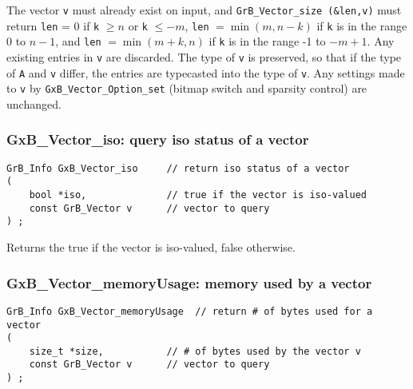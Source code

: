 \documentclass[12pt]{article}
\begin{document}
{The vector \verb'v' must already exist on input, and
\verb'GrB_Vector_size (&len,v)' must return \verb'len' = 0 if \verb'k' $\ge n$
or \verb'k' $\le -m$, \verb'len' $=\min(m,n-k)$ if \verb'k' is in the range 0
to $n-1$, and \verb'len' $=\min(m+k,n)$ if \verb'k' is in the range -1 to
$-m+1$.  Any existing entries in \verb'v' are discarded.  The type of \verb'v'
is preserved, so that if the type of \verb'A' and \verb'v' differ, the entries
are typecasted into the type of \verb'v'.  Any settings made to \verb'v' by
\verb'GxB_Vector_Option_set' (bitmap switch and sparsity control) are
unchanged.

\subsubsection{{\sf GxB\_Vector\_iso:} query iso status of a vector}
\label{vector_iso}

\begin{mdframed}[userdefinedwidth=6in]
{\footnotesize
\begin{verbatim}
GrB_Info GxB_Vector_iso     // return iso status of a vector
(
    bool *iso,              // true if the vector is iso-valued
    const GrB_Vector v      // vector to query
) ;
\end{verbatim} } \end{mdframed}

Returns the true if the vector is iso-valued, false otherwise.

\newpage
\subsubsection{{\sf GxB\_Vector\_memoryUsage:} memory used by a vector}
\label{vector_memusage}

\begin{mdframed}[userdefinedwidth=6in]
{\footnotesize
\begin{verbatim}
GrB_Info GxB_Vector_memoryUsage  // return # of bytes used for a vector
(
    size_t *size,           // # of bytes used by the vector v
    const GrB_Vector v      // vector to query
) ;
\end{verbatim} } \end{mdframed}

}
\end{document}
